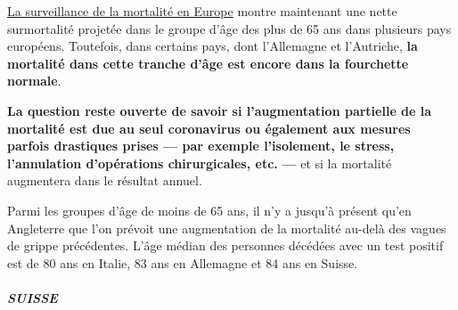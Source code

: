 \href{https://www.euromomo.eu/outputs/zscore_country_total.html}{La
surveillance de la mortalité en Europe} montre maintenant une nette
surmortalité projetée dans le groupe d'âge des plus de 65 ans dans
plusieurs pays européens. Toutefois, dans certains pays, dont
l'Allemagne et l'Autriche, \textbf{la mortalité dans cette tranche d'âge
est encore dans la fourchette normale}.

\textbf{La question reste ouverte de savoir si l'augmentation partielle
de la mortalité est due au seul coronavirus ou également aux mesures
parfois drastiques prises --- par exemple l'isolement, le stress,
l'annulation d'opérations chirurgicales, etc.} \textbf{---} et si la
mortalité augmentera dans le résultat annuel.

Parmi les groupes d'âge de moins de 65 ans, il n'y a jusqu'à présent
qu'en Angleterre que l'on prévoit une augmentation de la mortalité
au-delà des vagues de grippe précédentes. L'âge médian des personnes
décédées avec un test positif est de 80 ans en Italie, 83 ans en
Allemagne et 84 ans en Suisse.

\hypertarget{suisse}{%
\subparagraph{\texorpdfstring{\textbf{SUISSE}}{SUISSE}}\label{suisse}}

